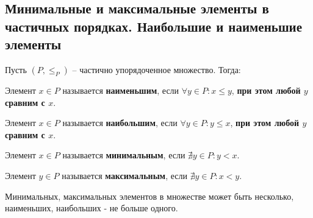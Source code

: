 \subsection{Минимальные и максимальные элементы в частичных порядках. Наибольшие и наименьшие элементы}

Пусть $(P, \le_P)$ -- частично упорядоченное множество. Тогда:

Элемент $x \in P$ называется \textbf{наименьшим}, если $\forall y \in P : x \le y$, \textbf{ при этом любой $y$ сравним с $x$}.

Элемент $x \in P$ называется \textbf{наибольшим}, если $\forall y \in P : y \le x$, \textbf{при этом любой $y$ сравним с $x$}.

Элемент $x \in P$ называется \textbf{минимальным}, если $\nexists y \in P: y < x$.

Элемент $y \in P$ называется \textbf{максимальным}, если $\nexists y \in P: x < y$.

Минимальных, максимальных элементов в множестве может быть несколько, наименьших, наибольших - не больше одного.
